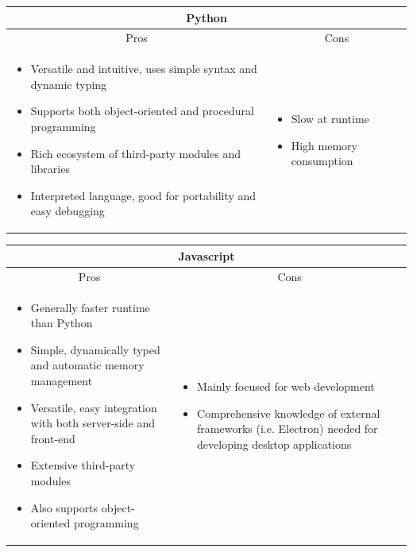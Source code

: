 \documentclass[../main/main.tex]{subfiles}
\begin{document}
\begin{longtable}{ll}
    \toprule
    \multicolumn{2}{c}{Python}\\
    \midrule
    \multicolumn{1}{c}{Pros} & \multicolumn{1}{c}{Cons}\\
    \midrule

    \parbox[t][][t]{0.5\textwidth}{
        \begin{itemize}
            \item Versatile and intuitive, uses simple syntax and dynamic typing
            \item Supports both object-oriented and procedural programming
            \item Rich ecosystem of third-party modules and libraries
            \item Interpreted language, good for portability and easy debugging
        \end{itemize}
    } & \parbox[t][][t]{0.5\textwidth}{
        \begin{itemize}
            \item Slow at runtime
            \item High memory consumption
        \end{itemize}
    }
    \\
    \bottomrule
\end{longtable}

\begin{longtable}{ll}
    \toprule
    \multicolumn{2}{c}{Javascript}\\
    \midrule
    \multicolumn{1}{c}{Pros} & \multicolumn{1}{c}{Cons}\\
    \midrule

    \parbox[t][][t]{0.5\textwidth}{
        \begin{itemize}
            \item Generally faster runtime than Python
            \item Simple, dynamically typed and automatic memory management
            \item Versatile, easy integration with both server-side and front-end
            \item Extensive third-party modules
            \item Also supports object-oriented programming
        \end{itemize}
    } & \parbox[t][][t]{0.5\textwidth}{
        \begin{itemize}
            \item Mainly focused for web development
            \item Comprehensive knowledge of external frameworks (i.e. Electron) needed for developing desktop applications
        \end{itemize}
    }
    \\
    \bottomrule
\end{longtable}
\end{document}
